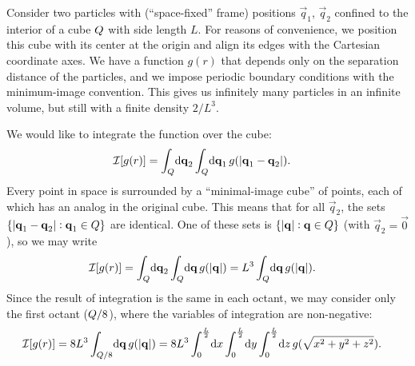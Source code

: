 Consider two particles with (``space-fixed'' frame) positions $\vec{q}_1$, $\vec{q}_2$ confined to the interior of a cube $Q$ with side length $L$.
For reasons of convenience, we position this cube with its center at the origin and align its edges with the Cartesian coordinate axes.
We have a function $g(r)$ that depends only on the separation distance of the particles, and we impose periodic boundary conditions with the minimum-image convention.
This gives us infinitely many particles in an infinite volume, but still with a finite density $2/L^3$.

We would like to integrate the function over the cube:
\begin{align}
	\mathcal{I}[g(r)]
	&= \int_\cube\! \dif \vec{q}_2 \int_\cube\! \dif \vec{q}_1 \, g(\abs[0]{\vec{q}_1 - \vec{q}_2}).
\end{align}
Every point in space is surrounded by a ``minimal-image cube'' of points, each of which has an analog in the original cube.
This means that for all $\vec{q}_2$, the sets $\{ \abs[0]{\bm{\mathbf{q}}_1 - \bm{\mathbf{q}}_2} : \bm{\mathbf{q}}_1 \in Q \}$ are identical.
One of these sets is $\{ \abs[0]{\bm{\mathbf{q}}} : \bm{\mathbf{q}} \in Q \}$ (with $\vec{q}_2 = \vec{0}$), so we may write
\begin{align}
	\mathcal{I}[g(r)]
	&= \int_\cube\! \dif \vec{q}_2 \int_\cube\! \dif \vec{q} \, g(\abs[0]{\vec{q}})
	= L^3 \int_\cube\! \dif \vec{q} \, g(\abs[0]{\vec{q}}).
		\label{eq:periodic-box-minimal-image}
\end{align}
Since the result of integration is the same in each octant, we may consider only the first octant ($Q/8$), where the variables of integration are non-negative:
\begin{align*}
	\mathcal{I}[g(r)]
	&= 8 L^3 \int_{\cube/8}\! \dif \vec{q} \, g(\abs[0]{\vec{q}})
	= 8 L^3 \int_0^{\frac{L}{2}}\! \dif x \int_0^{\frac{L}{2}}\! \dif y \int_0^{\frac{L}{2}}\! \dif z \, g(\sqrt{x^2 + y^2 + z^2}).
\end{align*}

